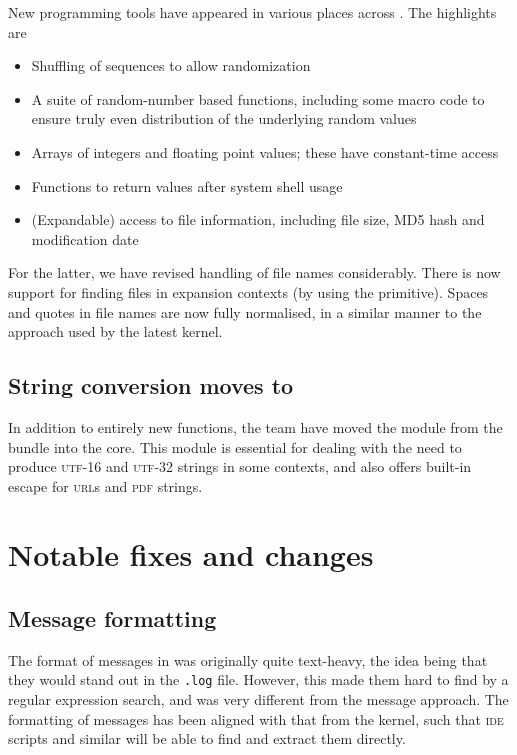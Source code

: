 \documentclass{ltnews}
\begin{document}
New programming tools have appeared in various places across .
The highlights are
\begin{itemize}
  \item Shuffling of sequences to allow randomization
  \item A suite of random-number based functions, including some macro code
    to ensure truly even distribution of the underlying random values
  \item Arrays of integers and floating point values; these have constant-time
    access
  \item Functions to return values after system shell usage
  \item (Expandable) access to file information, including file size, MD5
    hash and modification date
\end{itemize}

For the latter, we have revised handling of file names considerably. There is
now support for finding files in expansion contexts (by using the
 primitive). Spaces and quotes in file names are now fully
normalised, in a similar manner to the approach used by the latest \LaTeXe{}
kernel.

\subsection{String conversion moves to }

In addition to entirely new functions, the team have moved the
 module from the  bundle into the
 core. This module is essential for dealing with the need to produce
\textsc{utf}-16 and \textsc{utf}-32 strings in some contexts, and also offers
built-in escape for \textsc{url}s and \textsc{pdf} strings.

\section{Notable fixes and changes}

\subsection{Message formatting}

The format of messages in  was originally quite text-heavy, the idea
being that they would stand out in the \texttt{.log} file. However, this made
them hard to find by a regular expression search, and was very different from
the \LaTeXe{} message approach. The formatting of  messages has been
aligned with that from the \LaTeXe{} kernel, such that \textsc{ide} scripts and
similar will be able to find and extract them directly.
\end{document}
